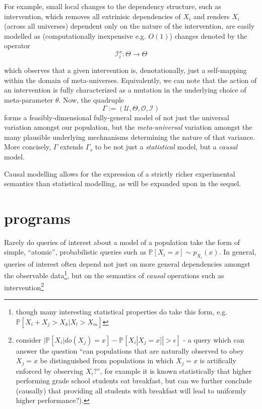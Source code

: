 \documentclass{article}
\begin{document}
For example, small local changes to the dependency structure, such as intervention, which removes all extrinisic dependencies of $X_i$ and renders $X_i$ (across all universes) dependent only on the nature of the intervention, are easily modelled as (computationally inexpensive e.g. $O(1)$) changes denoted by the operator $$\mathcal{I}_i^x : \Theta \to \Theta$$

which observes that a given intervention is, denotationally, just a self-mapping within the domain of meta-universes. Equivalently, we can note that the action of an intervention is fully characterized as a mutation in the underlying choice of meta-parameter $\theta$. Now, the quadruple $$\Gamma := (\mathcal{U}, \Theta, \mathcal{O}, \mathcal{I})$$ forms a feasibly-dimensional fully-general model of not just the universal variation amongst our population, but the \textit{meta-universal} variation amongst the many plausible underlying mechnanisms determining the nature of that variance. More concisely, $\Gamma$ extends $\Gamma_s$ to be not just a \textit{statistical} model, but a \textit{causal} model.

Causal modelling allows for the expression of a strictly richer experimental semantics than statistical modelling, as will be expanded upon in the sequel.

\section{\AIM programs}

Rarely do queries of interest about a model of a population take the form of simple, ``atomic'', probabilistic queries such as $\mathbb{P}[X_i = x] \sim p_{X_i}(x)$. In general, queries of interest often depend not just on more general dependencies amongst the observable data\footnote{though many interesting statistical properties do take this form, e.g. $\mathbb{P}[X_i + X_j > X_k | X_l > X_m]$}, but on the semantics of \textit{causal} operations such as intervention\footnote{consider $|\mathbb{P}[X_i | do(X_j) = x] - \mathbb{P}[X_i | X_j = x]| > \epsilon]$ - a query which can answer the question ``can populations that are naturally observed to obey $X_j = x$ be distinguished from populations in which $X_j=x$ is artifically enforced by observing $X_i$?'', for example it is known statistically that higher performing grade school students eat breakfast, but can we further conclude (causally) that providing all students with breakfast will lead to uniformly higher performance?).}
\end{document}
